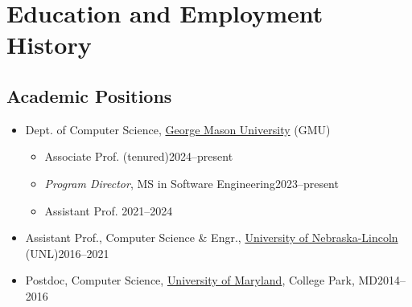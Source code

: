 \documentclass[11pt]{article}
\begin{document}


\section{Education and Employment History}
\subsection{Academic Positions}

\begin{itemize}
    \item Dept. of Computer Science, \href{https://cs.gmu.edu}{George Mason University} (GMU)
    \begin{itemize}
        \item Associate Prof. (tenured)\hfill 2024--present
        \item \emph{Program Director}, MS in Software Engineering\hfill 2023--present
        \item Assistant Prof. \hfill 2021--2024
        
    \end{itemize}
    
    \item Assistant Prof., Computer Science \& Engr., \href{https://computing.unl.edu}{University of Nebraska-Lincoln} (UNL)\hfill 2016--2021
    
    \item Postdoc, Computer Science,  \href{https://www.umd.edu}{University of Maryland}, College Park, MD\hfill 2014--2016

\end{itemize}
\end{document}
